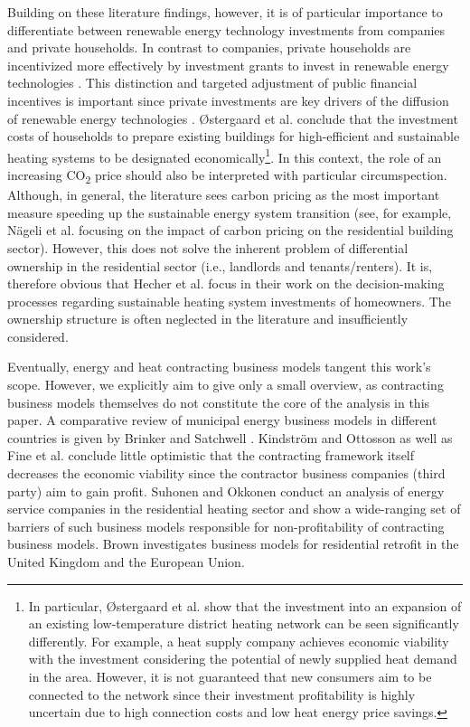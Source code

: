 Building on these literature findings, however, it is of particular importance to differentiate between renewable energy technology investments from companies and private households. In contrast to companies, private households are incentivized more effectively by investment grants to invest in renewable energy technologies \cite{roth2020impact}. This distinction and targeted adjustment of public financial incentives is important since private investments are key drivers of the diffusion of renewable energy technologies \cite{wustenhagen2012strategic}. {\O}stergaard et al. \cite{ostergaard2019costs} conclude that the investment costs of households to prepare existing buildings for high-efficient and sustainable heating systems to be designated economically\footnote{In particular, {\O}stergaard et al. \cite{ostergaard2019costs} show that the investment into an expansion of an existing low-temperature district heating network can be seen significantly differently. For example, a heat supply company achieves economic viability with the investment considering the potential of newly supplied heat demand in the area. However, it is not guaranteed that new consumers aim to be connected to the network since their investment profitability is highly uncertain due to high connection costs and low heat energy price savings.}. In this context, the role of an increasing CO\textsubscript{2} price should also be interpreted with particular circumspection. Although, in general, the literature sees carbon pricing as the most important measure speeding up the sustainable energy system transition (see, for example, Nägeli et al. \cite{nageli2020policies} focusing on the impact of carbon pricing on the residential building sector). However, this does not solve the inherent problem of differential ownership in the residential sector (i.e., landlords and tenants/renters). It is, therefore obvious that Hecher et al. \cite{hecher2017trigger} focus in their work on the decision-making processes regarding sustainable heating system investments of homeowners. The ownership structure is often neglected in the literature and insufficiently considered.\vspace{0.5cm} 

Eventually, energy and heat contracting business models tangent this work's scope. However, we explicitly aim to give only a small overview, as contracting business models themselves do not constitute the core of the analysis in this paper. A comparative review of municipal energy business models in different countries is given by Brinker and Satchwell \cite{brinker2020comparative}. Kindström and Ottosson \cite{kindstrom2016local} as well as Fine et al. \cite{fina2020profitability} conclude little optimistic that the contracting framework itself decreases the economic viability since the contractor business companies (third party) aim to gain profit. Suhonen and Okkonen \cite{suhonen2013energy} conduct an analysis of energy service companies in the residential heating sector and show a wide-ranging set of barriers of such business models responsible for non-profitability of contracting business models. Brown \cite{brown2018business} investigates business models for residential retrofit in the United Kingdom and the European Union.

